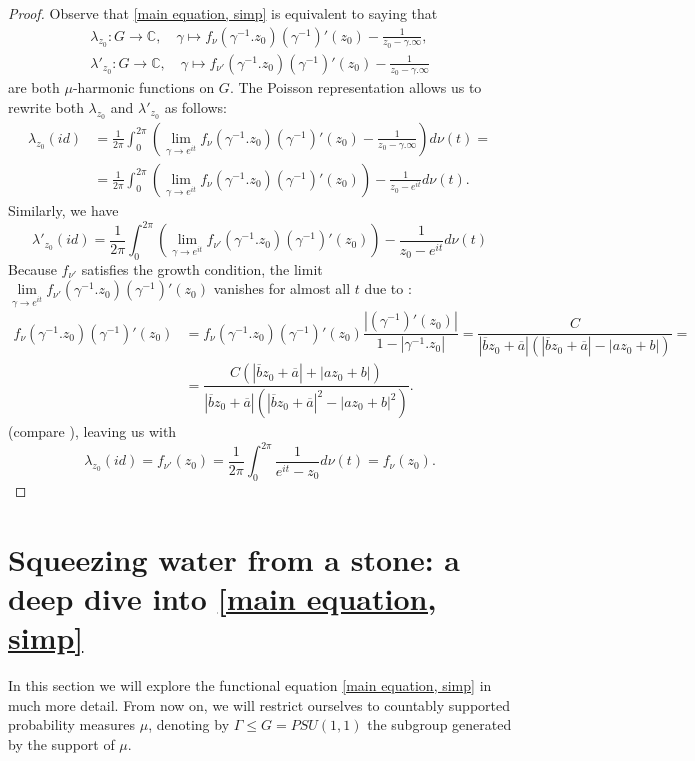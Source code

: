 \documentclass[11pt]{article}
\begin{document}
\begin{proof}
	Observe that \eqref{main equation, simp} is equivalent to saying that 
	\begin{gather*}
		\lambda_{z_0} : G \rightarrow \mathbb{C}, \quad \gamma \mapsto f_{\nu}(\gamma^{-1}.z_0)(\gamma^{-1})'(z_0) - \frac{1}{z_0 - \gamma.\infty}, \\
		\lambda'_{z_0} : G \rightarrow \mathbb{C}, \quad \gamma \mapsto f_{\nu'}(\gamma^{-1}.z_0)(\gamma^{-1})'(z_0) - \frac{1}{z_0 - \gamma.\infty}
	\end{gather*}
	are both $\mu$-harmonic functions on $G$. The Poisson representation allows us to rewrite both $\lambda_{z_0}$ and $\lambda'_{z_0}$ as follows:
	\[
	\begin{aligned}
		\lambda_{z_0}(id) 
		&= \frac{1}{2 \pi} \int_{0}^{2 \pi} \left(  \lim\limits_{\gamma \rightarrow e^{it}} f_{\nu}(\gamma^{-1}.z_0)(\gamma^{-1})'(z_0) - \frac{1}{z_0 - \gamma.\infty} \right) d\nu(t) = \\ 
		&= \frac{1}{2 \pi} \int_{0}^{2 \pi} \left(  \lim\limits_{\gamma \rightarrow e^{it}} f_{\nu}(\gamma^{-1}.z_0)(\gamma^{-1})'(z_0) \right) - \frac{1}{z_0 - e^{it}}  d\nu(t).
	\end{aligned}
	\]
	Similarly, we have
	\[
	\lambda'_{z_0}(id) = \frac{1}{2 \pi} \int_{0}^{2 \pi} \left( \lim\limits_{\gamma \rightarrow e^{it}} f_{\nu'}(\gamma^{-1}.z_0)(\gamma^{-1})'(z_0) \right) - \frac{1}{z_0 - e^{it}}  d\nu(t)
	\]
	Because $f_{\nu'}$ satisfies the growth condition, the limit $\lim\limits_{\gamma \rightarrow e^{it}} f_{\nu'}(\gamma^{-1}.z_0)(\gamma^{-1})'(z_0)$ vanishes for almost all $t$ due to \cite[Equation 2.1.8]{book:738388}:
	\[
	\begin{aligned}
		f_{\nu}(\gamma^{-1}.z_0)(\gamma^{-1})'(z_0) & = f_{\nu}(\gamma^{-1}.z_0)(\gamma^{-1})'(z_0) \dfrac{|(\gamma^{-1})'(z_0)|}{1 - |\gamma^{-1}.z_0|} = \dfrac{C}{|\overline{b} z_0 + \overline{a}|(|\overline{b} z_0 + \overline{a}| - |a z_0 + b|)} = \\ 
		&= \dfrac{C (|\overline{b} z_0 + \overline{a}| + |a z_0 + b|)}{|\overline{b} z_0 + \overline{a}|(|\overline{b} z_0 + \overline{a}|^2 - |a z_0 + b|^2)}.
	\end{aligned}
	\]
	 (compare \cite[eq 2.1.8]{book:738388}), leaving us with
	\[
	\lambda_{z_0}(id) = f_{\nu'}(z_0) = \frac{1}{2 \pi} \int_{0}^{2 \pi}\frac{1}{e^{it} - z_0}  d\nu(t) = f_\nu(z_0).
	\]
\end{proof}


\section{Squeezing water from a stone: a deep dive into \eqref{main equation, simp}}
\label{Squeezing water from a stone}
In this section we will explore the functional equation \eqref{main equation, simp} in much more detail. From now on, we will restrict ourselves to countably supported probability measures $\mu$, denoting by $\Gamma \le G = PSU(1,1)$ the subgroup generated by the support of $\mu$.
\end{document}
